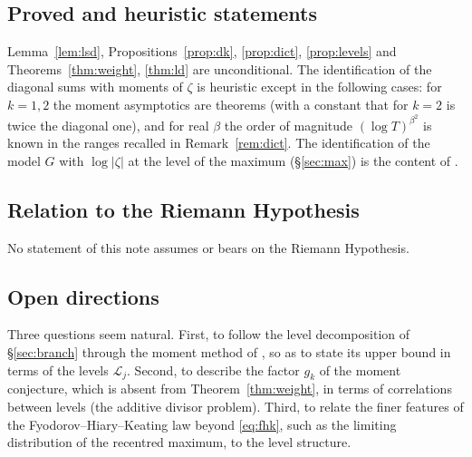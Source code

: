 \documentclass[11pt]{amsart}
\theoremstyle{definition}
\begin{document}
\subsection{Proved and heuristic statements}
Lemma~\ref{lem:lsd}, Propositions~\ref{prop:dk}, \ref{prop:dict}, \ref{prop:levels} and
Theorems~\ref{thm:weight}, \ref{thm:ld} are unconditional. The identification of the diagonal sums with moments
of $\zeta$ is heuristic except in the following cases: for $k=1,2$ the moment asymptotics are theorems
\cite{HL,Ingham} (with a constant that for $k=2$ is twice the diagonal one), and for real $\beta$ the order of
magnitude $(\log T)^{\beta^2}$ is known in the ranges recalled in Remark~\ref{rem:dict}. The identification of
the model $G$ with $\log|\zeta|$ at the level of the maximum (\S\ref{sec:max}) is the content of
\cite{ABBRS,Najnudel,ABR1,ABR2,HarperFHK}.

\subsection{Relation to the Riemann Hypothesis}
No statement of this note assumes or bears on the Riemann Hypothesis.

\subsection{Open directions}
Three questions seem natural. First, to follow the level decomposition of \S\ref{sec:branch} through the moment
method of \cite{ABBRS}, so as to state its upper bound in terms of the levels $\mathcal L_j$. Second, to
describe the factor $g_k$ of the moment conjecture, which is absent from Theorem~\ref{thm:weight}, in terms of
correlations between levels (the additive divisor problem). Third, to relate the finer features of the
Fyodorov--Hiary--Keating law beyond \eqref{eq:fhk}, such as the limiting distribution of the recentred maximum,
to the level structure.
\end{document}
